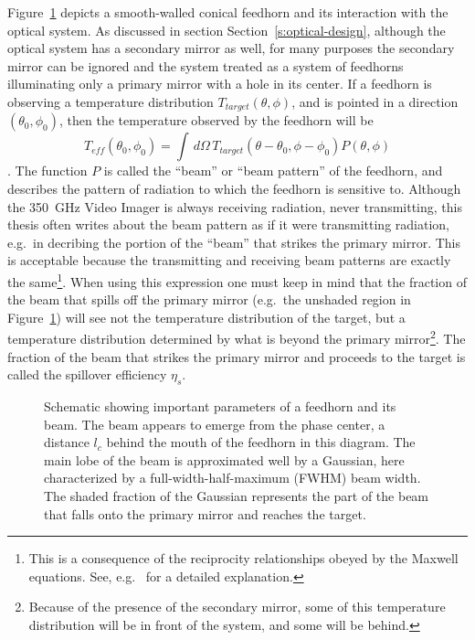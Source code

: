 \documentclass[10pt,twocolumn,article]{memoir}
\newcommand*{\figref}[1]{Figure~\ref{#1}}
\newcommand*{\sectionref}[1]{Section~\ref{#1}}
\newcommand*{\FWHM}{{\small FWHM}\xspace}
\newcommand*{\Imager}{350~GHz Video Imager\xspace}
\begin{document}
\figref{fig:feedhorn-parms} depicts a smooth-walled conical feedhorn and its interaction with the optical system.
As discussed in section \sectionref{s:optical-design}, although the optical system has a secondary mirror as well, for many purposes the secondary mirror can be ignored and the system treated as a system of feedhorns illuminating only a primary mirror with a hole in its center.
If a feedhorn is observing a temperature distribution $T_{target}(\theta,\phi)$, and is pointed in a direction $(\theta_0, \phi_0)$, then the temperature observed by the feedhorn will be
\[
    T_{eff}(\theta_0,\phi_0) = \int \, d \Omega \, T_{target}(\theta - \theta_0,\phi - \phi_0) P(\theta,\phi)
\].
The function $P$ is called the ``beam'' or ``beam pattern'' of the feedhorn, and describes the pattern of radiation to which the feedhorn is sensitive to.
Although the \Imager is always receiving radiation, never transmitting, this thesis often writes about the beam pattern as if it were transmitting radiation, e.g.\ in decribing the portion of the ``beam'' that strikes the primary mirror.
This is acceptable because the transmitting and receiving beam patterns are exactly the same\footnote{This is a consequence of the reciprocity relationships obeyed by the Maxwell equations. See, e.g.\ \cite{xxx} for a detailed explanation.}.
When using this expression one must keep in mind that the fraction of the beam that spills off the primary mirror (e.g.\ the unshaded region in \figref{fig:feedhorn-parms}) will see not the temperature distribution of the target, but a temperature distribution determined by what is beyond the primary mirror\footnote{Because of the presence of the secondary mirror, some of this temperature distribution will be in front of the system, and some will be behind.}.
The fraction of the beam that strikes the primary mirror and proceeds to the target is called the spillover efficiency $\eta_s$.

\begin{figure}
\centering

\caption{Schematic showing important parameters of a feedhorn and its beam. The beam appears to emerge from the phase center, a distance $l_c$ behind the mouth of the feedhorn in this diagram. The main lobe of the beam is approximated well by a Gaussian, here characterized by a full-width-half-maximum (\FWHM) beam width. The shaded fraction of the Gaussian represents the part of the beam that falls onto the primary mirror and reaches the target.}
\label{fig:feedhorn-parms}
\end{figure}
\end{document}
